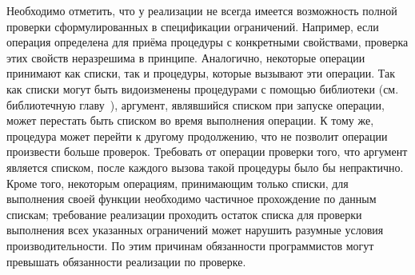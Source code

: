 Необходимо отметить, что у реализации не всегда имеется возможность полной проверки
сформулированных в спецификации ограничений. Например, если операция определена для приёма
процедуры с конкретными свойствами, проверка этих свойств неразрешима в принципе. Аналогично,
некоторые операции принимают как списки, так и процедуры, которые вызывают эти операции. Так как
списки могут быть видоизменены процедурами с помощью библиотеки \textbf{}
(см. библиотечную главу~), аргумент, являвшийся
списком при запуске операции, может перестать быть списком во время выполнения операции. К тому
же, процедура может перейти к другому продолжению, что не позволит операции произвести больше
проверок. Требовать от операции проверки того, что аргумент является списком, после каждого вызова
такой процедуры было бы непрактично. Кроме того, некоторым операциям, принимающим только
списки, для выполнения своей функции необходимо частичное прохождение по данным спискам; требование
реализации проходить остаток списка для проверки выполнения всех указанных ограничений
может нарушить разумные условия производительности. По этим причинам обязанности программистов
могут превышать обязанности реализации по проверке.

